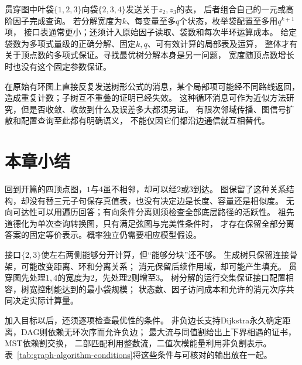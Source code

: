 贯穿图中叶袋\(\{1,2,3\}\)向袋\(\{2,3,4\}\)发送关于\(z_2,z_3\)的表，
后者组合自己的一元或高阶因子完成查询。
若分解宽度为\(k\)、每变量至多\(q\)个状态，枚举袋配置至多用\(q^{k+1}\)项，
接口表通常更小；还须计入原始因子读取、袋数和每次半环运算成本。
给定袋数为多项式量级的正确分解、固定\(k,q\)、可有效计算的局部表及运算，
整体才有关于顶点数的多项式保证。寻找最优树分解本身是另一问题，
宽度随顶点数增长时也没有这个固定参数保证。

在原始有环图上直接反复发送树形公式的消息，某个局部项可能经不同路线返回，
造成重复计数；子树互不重叠的证明已经失效。
这种循环消息可作为近似方法研究，但是否收敛、收敛到什么及误差多大都须另证。
有限次邻域传播、图信号扩散和配置查询至此都有明确语义，
不能仅因它们都沿边通信就互相替代。

\section{本章小结}
\label{sec:graph-theory-summary}

回到开篇的四顶点图，\(1\)与\(4\)虽不相邻，却可以经\(2\)或\(3\)到达。
图保留了这种关系结构，却没有替三元子句保存真值表，也没有决定边是长度、容量还是相似度。
无向可达性可以用遍历回答；有向条件分离则须检查全部底层路径的活跃性。
祖先道德化为单次查询转换图，只有满足弦图与完美性条件时，
才存在保留全部分离答案的固定等价表示。概率独立仍需要相应模型假设。

接口\(\{2,3\}\)使左右两侧能够分开计算，但“能够分块”还不够。
生成树只保留连接骨架，可能改变距离、环和分离关系；
消元保留后续作用域，却可能产生填充。
贯穿图先处理\(1,4\)的宽度为\(2\)，先处理\(2\)则增至\(3\)。
树分解的运行交集保证接口配置相容，树宽控制能达到的最小袋规模；
状态数、因子访问成本和允许的消元次序共同决定实际计算量。

加入目标以后，还须逐项检查最优性的条件。
非负边长支持Dijkstra永久确定距离，DAG则依赖无环次序而允许负边；
最大流与同值割给出上下界相遇的证书，MST依赖割交换，
二部匹配利用整数流，二值次模能量利用非负割表示。
表~\ref{tab:graph-algorithm-conditions}将这些条件与可核对的输出放在一起。

